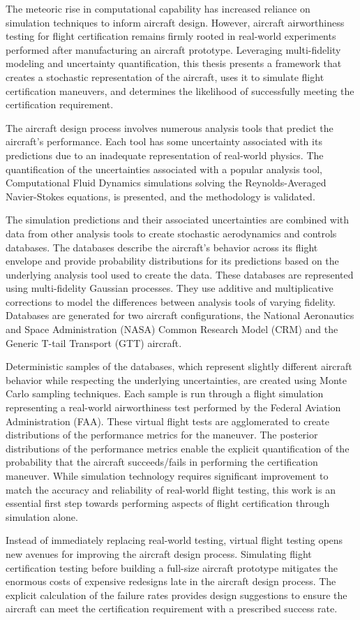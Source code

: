 The meteoric rise in computational capability has increased reliance on simulation techniques to inform aircraft design.
However, aircraft airworthiness testing for flight certification remains firmly rooted in real-world experiments performed after manufacturing an aircraft prototype.
Leveraging multi-fidelity modeling and uncertainty quantification, this thesis presents a framework that creates a stochastic representation of the aircraft, uses it to simulate flight certification maneuvers, and determines the likelihood of successfully meeting the certification requirement. 

The aircraft design process involves numerous analysis tools that predict the aircraft's performance.
Each tool has some uncertainty associated with its predictions due to an inadequate representation of real-world physics.
The quantification of the uncertainties associated with a popular analysis tool, Computational Fluid Dynamics simulations solving the Reynolds-Averaged Navier-Stokes equations, is presented, and the methodology is validated.

The simulation predictions and their associated uncertainties are combined with data from other analysis tools to create stochastic aerodynamics and controls databases.
The databases describe the aircraft's behavior across its flight envelope and provide probability distributions for its predictions based on the underlying analysis tool used to create the data. 
These databases are represented using multi-fidelity Gaussian processes. They use additive and multiplicative corrections to model the differences between analysis tools of varying fidelity.
Databases are generated for two aircraft configurations, the National Aeronautics and Space Administration (NASA) Common Research Model (CRM) and the Generic T-tail Transport (GTT) aircraft.

Deterministic samples of the databases, which represent slightly different aircraft behavior while respecting the underlying uncertainties, are created using Monte Carlo sampling techniques. 
Each sample is run through a flight simulation representing a real-world airworthiness test performed by the Federal Aviation Administration (FAA).
These virtual flight tests are agglomerated to create distributions of the performance metrics for the maneuver. 
The posterior distributions of the performance metrics enable the explicit quantification of the probability that the aircraft succeeds/fails in performing the certification maneuver. 
While simulation technology requires significant improvement to match the accuracy and reliability of real-world flight testing, this work is an essential first step towards performing aspects of flight certification through simulation alone. 

Instead of immediately replacing real-world testing, virtual flight testing opens new avenues for improving the aircraft design process.
Simulating flight certification testing before building a full-size aircraft prototype mitigates the enormous costs of expensive redesigns late in the aircraft design process.
The explicit calculation of the failure rates provides design suggestions to ensure the aircraft can meet the certification requirement with a prescribed success rate.